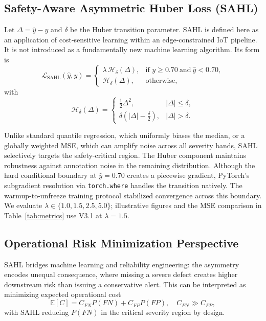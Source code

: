 \documentclass[journal]{IEEEtran}
\begin{document}
\subsection{Safety-Aware Asymmetric Huber Loss (SAHL)}\label{sec:sahl}
Let $\Delta=\hat{y}-y$ and $\delta$ be the Huber transition parameter. SAHL is defined here as an application of cost-sensitive learning within an edge-constrained IoT pipeline. It is not introduced as a fundamentally new machine learning algorithm. Its form is
\begin{equation}
\mathcal{L}_{\mathrm{SAHL}}(\hat{y},y)=
\begin{cases}
\lambda\,\mathcal{H}_{\delta}(\Delta), & \text{if } y\ge 0.70\ \text{and}\ \hat{y}<0.70,\\
\mathcal{H}_{\delta}(\Delta), & \text{otherwise},
\end{cases}
\label{eq:sahl}
\end{equation}
with
\begin{equation}
\mathcal{H}_{\delta}(\Delta)=
\begin{cases}
\tfrac{1}{2}\Delta^2, & |\Delta|\le \delta,\\
\delta\left(|\Delta|-\tfrac{\delta}{2}\right), & |\Delta|>\delta.
\end{cases}
\label{eq:huber}
\end{equation}

Unlike standard quantile regression, which uniformly biases the median, or a globally weighted MSE, which can amplify noise across all severity bands, SAHL selectively targets the safety-critical region. The Huber component maintains robustness against annotation noise in the remaining distribution. Although the hard conditional boundary at $\hat{y} = 0.70$ creates a piecewise gradient, PyTorch's subgradient resolution via \texttt{torch.where} handles the transition natively. The warmup-to-unfreeze training protocol stabilized convergence across this boundary. We evaluate $\lambda \in \{1.0, 1.5, 2.5, 5.0\}$; illustrative figures and the MSE comparison in Table~\ref{tab:metrics} use V3.1 at $\lambda=1.5$.

\subsection{Operational Risk Minimization Perspective}
SAHL bridges machine learning and reliability engineering: the asymmetry encodes unequal consequence, where missing a severe defect creates higher downstream risk than issuing a conservative alert. This can be interpreted as minimizing expected operational cost
\begin{equation}
\mathbb{E}[C]=C_{FN}P(FN)+C_{FP}P(FP), \quad C_{FN}\gg C_{FP},
\label{eq:operational_cost}
\end{equation}
with SAHL reducing $P(FN)$ in the critical severity region by design.
\end{document}
